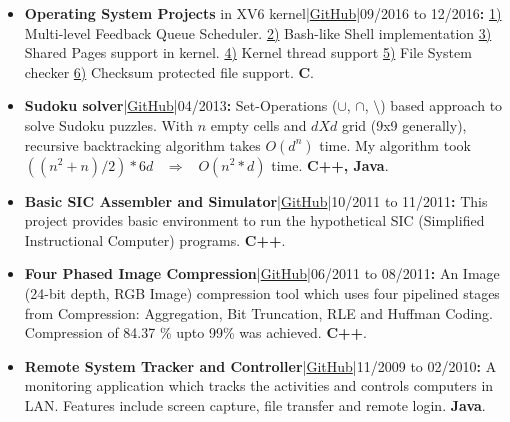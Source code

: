 \documentclass[a4paper, 10pt]{extarticle}
\begin{document}
\begin{large}
\begin{itemize}
    \item{\textbf{Operating System Projects} in XV6 kernel|\href{https://github.com/pradeep0605/CS537-IntroToOS}{GitHub}|09/2016 to 12/2016\textbf{{\Large{:}}} \href{https://github.com/pradeep0605/CS537-IntroToOS/tree/master/Project2b}{1)} Multi-level Feedback Queue Scheduler. \href{https://github.com/pradeep0605/CS537-IntroToOS-Project2a}{2)} Bash-like Shell implementation \href{https://github.com/pradeep0605/CS537-IntroToOS-Project3b}{3)} Shared Pages support in kernel. \href{https://github.com/pradeep0605/CS537-IntroToOS/tree/master/Project4b}{4)} Kernel thread support \href{https://github.com/pradeep0605/CS537-IntroToOS/tree/master/Project5a}{5)} File System checker \href{https://github.com/pradeep0605/CS537-IntroToOS/tree/master/Project5b}{6)} Checksum protected file support. \textbf{C}.}
    
    \item{\textbf{Sudoku solver}|\href{https://github.com/pradeep0605/Sudoku_Solver}{GitHub}|04/2013\textbf{{\Large{:}}} Set-Operations ({$\cup$}, {$\cap$}, {$\setminus$})  based approach to solve Sudoku puzzles. With $n$ empty cells and $d X d$ grid (9x9 generally), recursive backtracking algorithm takes  $O(d^n)$ time. My algorithm took $((n^2 + n) / 2) * 6d$ \ $\Longrightarrow$ \ $O(n^2 *d)$ time. \textbf{C++, Java}.}  
    
    \item{\textbf{Basic SIC Assembler and Simulator}|\href{https://github.com/pradeep0605/SIC_assembler_and_simulator}{GitHub}|10/2011 to 11/2011\textbf{{\Large{:}}} This project provides basic environment to run the hypothetical SIC (Simplified Instructional Computer) programs. \textbf{C++}.} 
    
     \item{\textbf{Four Phased Image Compression}|\href{https://github.com/pradeep0605/FourPhasedImageCompressor}{GitHub}|06/2011 to 08/2011\textbf{{\Large{:}}} An Image (24-bit depth, RGB Image) compression tool which uses four pipelined stages from Compression: Aggregation, Bit Truncation, RLE and Huffman Coding. Compression of 84.37 \% upto 99\% was achieved. \textbf{C++}.} 
    
    \item{\textbf{Remote System Tracker and Controller}|\href{https://github.com/pradeep0605/RemoteSystemTrackerAndController}{GitHub}|11/2009 to 02/2010\textbf{{\Large{:}}} A monitoring application which tracks the activities and controls computers in LAN. Features include screen capture, file transfer and remote login. \textbf{Java}.} 
    

\end{itemize}
\end{large}
\end{document}

